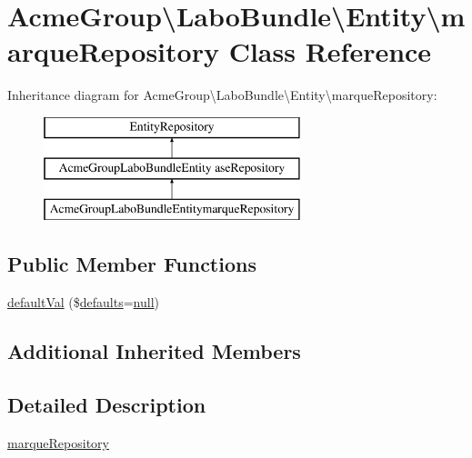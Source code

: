 \hypertarget{class_acme_group_1_1_labo_bundle_1_1_entity_1_1marque_repository}{\section{Acme\+Group\textbackslash{}Labo\+Bundle\textbackslash{}Entity\textbackslash{}marque\+Repository Class Reference}
\label{class_acme_group_1_1_labo_bundle_1_1_entity_1_1marque_repository}
}
Inheritance diagram for Acme\+Group\textbackslash{}Labo\+Bundle\textbackslash{}Entity\textbackslash{}marque\+Repository\+:\begin{figure}[H]
\begin{center}
\leavevmode
\includegraphics[height=3.000000cm]{class_acme_group_1_1_labo_bundle_1_1_entity_1_1marque_repository}
\end{center}
\end{figure}
\subsection*{Public Member Functions}
\begin{DoxyCompactItemize}
\item 
\hyperlink{class_acme_group_1_1_labo_bundle_1_1_entity_1_1marque_repository_a34635be0364f3e3b991c8e54bfe67b1f}{default\+Val} (\$\hyperlink{model_8defaults_8js_a9114d742403a54e409eca2e2c78bff56}{defaults}=\hyperlink{validate_8js_afb8e110345c45e74478894341ab6b28e}{null})
\end{DoxyCompactItemize}
\subsection*{Additional Inherited Members}


\subsection{Detailed Description}
\hyperlink{class_acme_group_1_1_labo_bundle_1_1_entity_1_1marque_repository}{marque\+Repository}

